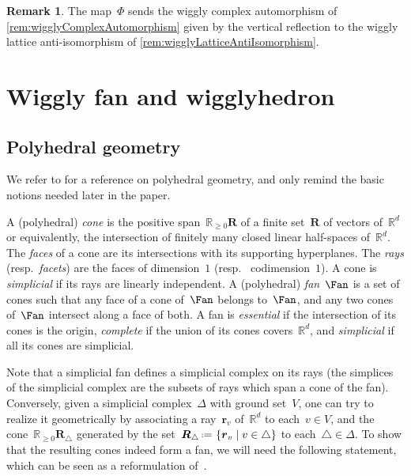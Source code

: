 \documentclass{amsart}
\theoremstyle{definition}
\newtheorem{remark}[theorem]{Remark}
\newcommand{\R}{\mathbb{R}} %
\renewcommand{\b}[1]{{\boldsymbol{#1}}} %
\newcommand{\set}[2]{\left\{ #1 \;\middle|\; #2 \right\}} %
\newcommand{\eqdef}{\mbox{\,\raisebox{0.2ex}{\scriptsize\ensuremath{\mathrm:}}\ensuremath{=}\,}} %
\newcommand{\darkblue}{\color{darkblue}} %
\newcommand{\defn}[1]{\textsl{\darkblue #1}} %
\begin{document}
\begin{remark}
The map~$\Phi$ sends the wiggly complex automorphism of \cref{rem:wigglyComplexAutomorphism} given by the vertical reflection to the wiggly lattice anti-isomorphism of \cref{rem:wigglyLatticeAntiIsomorphism}.
\end{remark}


\section{Wiggly fan and wigglyhedron}
\label{sec:geometry}


\subsection{Polyhedral geometry}
\label{subsec:polyhedralGeometry}

We refer to \cite{Ziegler-polytopes} for a reference on polyhedral geometry, and only remind the basic notions needed later in the paper.

A (polyhedral) \defn{cone} is the positive span~$\R_{\ge 0}\b{R}$ of a finite set~$\b{R}$ of vectors of~$\R^d$ or equivalently, the intersection of finitely many closed linear half-spaces of~$\R^d.$ 
The \defn{faces} of a cone are its intersections with its supporting hyperplanes. 
The \defn{rays} (resp.~\defn{facets}) are the faces of dimension~$1$ (resp.~ codimension~$1$).
A cone is \defn{simplicial} if its rays are linearly independent.
A (polyhedral) \defn{fan}~$\Fan$ is a set of cones such that any face of a cone of~$\Fan$ belongs to~$\Fan$, and any two cones of~$\Fan$ intersect along a face of both. 
A fan is \defn{essential} if the intersection of its cones is the origin, \defn{complete} if the union of its cones covers~$\R^d$, and \defn{simplicial} if all its cones are simplicial.

Note that a simplicial fan defines a simplicial complex on its rays (the simplices of the simplicial complex are the subsets of rays which span a cone of the fan).
Conversely, given a simplicial complex~$\Delta$ with ground set~$V$, one can try to realize it geometrically by associating a ray~$\b{r}_v$ of~$\R^d$ to each~$v \in V$, and the cone~$\R_{\ge 0}\b{R}_\triangle$ generated by the set~$\b{R}_\triangle \eqdef \set{\b{r}_v}{v \in \triangle}$ to each~$\triangle \in \Delta$.
To show that the resulting cones indeed form a fan, we will need the following statement, which can be seen as a reformulation of~\cite[Coro.~4.5.20]{DeLoeraRambauSantos}.
\end{document}
